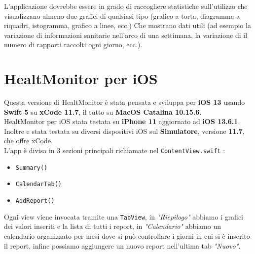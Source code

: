 \documentclass{article}
\begin{document}
L'applicazione dovrebbe essere in grado di raccogliere statistiche sull'utilizzo che visualizzano almeno due grafici di qualsiasi tipo (grafico a torta, diagramma a riquadri, istogramma, grafico a linee, ecc.) Che mostrano dati utili (ad esempio la variazione di informazioni sanitarie nell'arco di una settimana, la variazione di il numero di rapporti raccolti ogni giorno, ecc.).


\newpage
\section{HealtMonitor per iOS}

Questa versione di HealtMonitor è stata pensata e sviluppa per \textbf{iOS 13} usando \textbf{Swift 5} su \textbf{xCode 11.7}, il tutto su \textbf{MacOS Catalina 10.15.6}.\\
HealtMonitor per iOS stata testata su \textbf{iPhone 11} aggiornato ad \textbf{iOS 13.6.1}. Inoltre e stata testata su diversi dispositivi iOS sul \textbf{Simulatore}, versione \textbf{11.7}, che offre xCode.\\


L'app è divisa in 3 sezioni principali richiamate nel \texttt{ContentView.swift} : 
\begin{itemize}
  \item \texttt{Summary()}
  \item \texttt{CalendarTab()}
  \item \texttt{AddReport() }
\end{itemize}

Ogni view viene invocata tramite una \texttt{TabView}, in \textit{"Riepilogo"} abbiamo i grafici dei valori inseriti e la lista di tutti i report, in \textit{"Calendario"} abbiamo un calendario organizzato per mesi dove si può controllare i giorni in cui si è inserito il report, infine possiamo aggiungere un nuovo report nell'ultima tab \textit{"Nuovo"}.

\medskip
\end{document}

